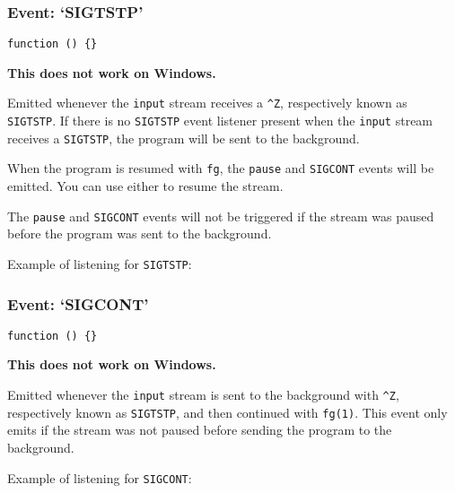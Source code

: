 \subsubsection{\texorpdfstring{Event:
`SIGTSTP'}{Event: SIGTSTP}}\label{event-sigtstp}

\texttt{function\ ()\ \{\}}

\textbf{This does not work on Windows.}

Emitted whenever the \texttt{input} stream receives a \texttt{\^{}Z},
respectively known as \texttt{SIGTSTP}. If there is no \texttt{SIGTSTP}
event listener present when the \texttt{input} stream receives a
\texttt{SIGTSTP}, the program will be sent to the background.

When the program is resumed with \texttt{fg}, the \texttt{pause} and
\texttt{SIGCONT} events will be emitted. You can use either to resume
the stream.

The \texttt{pause} and \texttt{SIGCONT} events will not be triggered if
the stream was paused before the program was sent to the background.

Example of listening for \texttt{SIGTSTP}:

\begin{Shaded}
\begin{Highlighting}[]
\NormalTok{(}\NormalTok{, }\NormalTok{() \{}
  \NormalTok{(}\NormalTok{);}
\NormalTok{\});}
\end{Highlighting}
\end{Shaded}

\subsubsection{\texorpdfstring{Event:
`SIGCONT'}{Event: SIGCONT}}\label{event-sigcont}

\texttt{function\ ()\ \{\}}

\textbf{This does not work on Windows.}

Emitted whenever the \texttt{input} stream is sent to the background
with \texttt{\^{}Z}, respectively known as \texttt{SIGTSTP}, and then
continued with \texttt{fg(1)}. This event only emits if the stream was
not paused before sending the program to the background.

Example of listening for \texttt{SIGCONT}:

